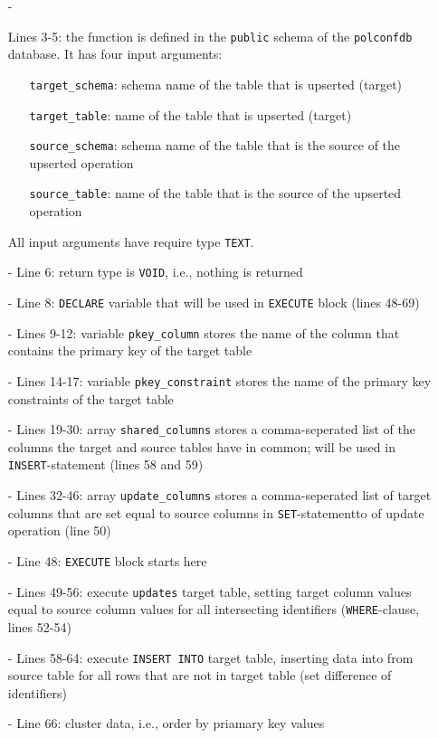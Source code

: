 \begin{itemize}
\item[-]{Lines 3-5: 
the function is defined in the \texttt{public} schema of the \texttt{polconfdb} database.
It has four input arguments:
  \begin{itemize}
  \item[]{\texttt{target\_schema}: schema name of the table that is upserted (target)}
  \item[]{\texttt{target\_table}: name of the table that is upserted (target)}
  \item[]{\texttt{source\_schema}: schema name of the table that is the source of the upserted operation}
  \item[]{\texttt{source\_table}: name of the table that is the source of the upserted operation}
  \end{itemize}
All input arguments have require type \texttt{TEXT}.
}
\item[-]{Line 6: return type is \texttt{VOID}, i.e., nothing is returned}
\item[-]{Line 8: \texttt{DECLARE} variable that will be used in \texttt{EXECUTE} block (lines 48-69)}
\item[-]{Lines 9-12: variable \texttt{pkey\_column} stores the name of the column that contains the primary key of the target table}
\item[-]{Lines 14-17: variable \texttt{pkey\_constraint} stores the name of the primary key constraints of the target table}
\item[-]{Lines 19-30: array \texttt{shared\_columns} stores a comma-seperated list of the columns the target and source tables have in common; will be used in \texttt{INSERT}-statement (lines 58 and 59)}
\item[-]{Lines 32-46: array \texttt{update\_columns} stores a comma-seperated list of target columns that are set equal to source columns in \texttt{SET}-statementto of update operation (line 50)}
\item[-]{Line 48: \texttt{EXECUTE} block starts here}
\item[-]{Lines 49-56: execute \texttt{updates} target table, setting target column values equal to source column values for all intersecting identifiers (\texttt{WHERE}-clause, lines 52-54)}
\item[-]{Lines 58-64: execute \texttt{INSERT INTO} target table, inserting data into from source table for all rows that are not in target table (set difference of identifiers)}
\item[-]{Line 66: cluster data, i.e., order by priamary key values}
\end{itemize}

